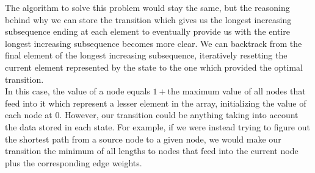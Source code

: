 \documentclass{article}
\begin{document}
\hfill\break
The algorithm to solve this problem would stay the same, but the reasoning behind why we can store the transition which gives us the longest increasing subsequence ending at each element to eventually provide us with the entire longest increasing subsequence becomes more clear. We can backtrack from the final element of the longest increasing subsequence, iteratively resetting the current element represented by the state to the one which provided the optimal transition.
\\
\hfill\break
In this case, the value of a node equals $1+ $the maximum value of all nodes that feed into it which represent a lesser element in the array, initializing the value of each node at $0$. However, our transition could be anything taking into account the data stored in each state. For example, if we were instead trying to figure out the shortest path from a source node to a given node, we would make our transition the minimum of all lengths to nodes that feed into the current node plus the corresponding edge weights.
\end{document}
